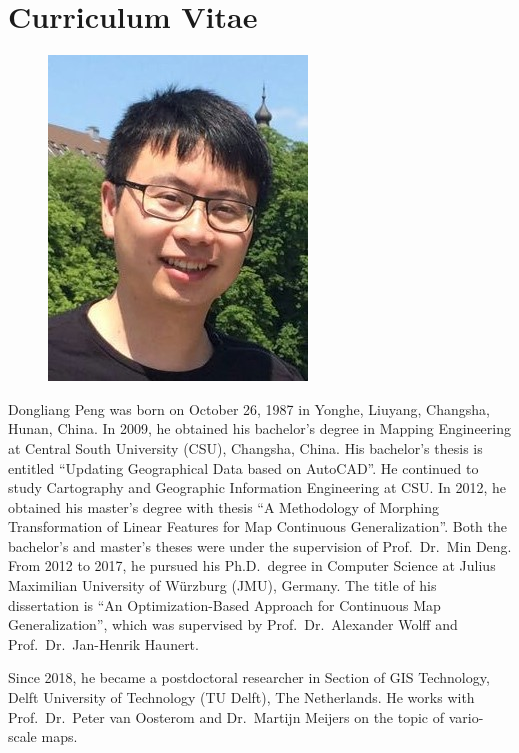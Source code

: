 
\chapter*{Curriculum Vitae}%
%

\begin{figure}
\centering
\vspace{-4.0mm}
\includegraphics[width=\linewidth]{images/peng_4x3.jpg}
\end{figure}

Dongliang Peng was born on October 26, 1987 
in Yonghe, Liuyang, Changsha, Hunan, China.
In 2009, he obtained his bachelor's degree in Mapping Engineering
at Central South University (CSU), Changsha, China.
His bachelor's thesis is entitled 
``Updating Geographical Data based on AutoCAD''.
He continued to study 
Cartography and Geographic Information Engineering at CSU.
In 2012, he obtained his master's degree with thesis 
``A Methodology of Morphing Transformation of Linear Features
for Map Continuous Generalization''.
Both the bachelor's and master's theses 
were under the supervision of Prof.\ Dr.\ Min Deng.
From 2012 to 2017, he pursued his Ph.D.\ degree in Computer Science
at Julius Maximilian University of Würzburg (JMU), Germany.
The title of his dissertation is
``An Optimization-Based Approach for Continuous Map Generalization'',
which was supervised by
Prof.\ Dr.\ Alexander Wolff and Prof.\ Dr.\ Jan-Henrik Haunert.


Since 2018, he became a postdoctoral researcher
in Section of GIS Technology,
Delft University of Technology (TU Delft), The Netherlands.
He works with Prof.\ Dr.\ Peter van Oosterom and
Dr.\ Martijn Meijers on the topic of vario-scale maps. 



